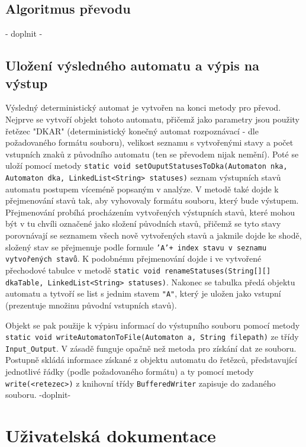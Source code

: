 \documentclass[11pt]{article}
\begin{document}
\subsection{Algoritmus převodu}
- doplnit -

\subsection{Uložení výsledného automatu a výpis na výstup}
Výsledný deterministický automat je vytvořen na konci metody pro převod. Nejprve se vytvoří objekt tohoto automatu, přičemž jako parametry jsou použity řetězec "DKAR" (deterministický konečný automat rozpoznávací - dle požadovaného formátu souboru), velikost seznamu s vytvořenými stavy a počet vstupních znaků z původního automatu (ten se převodem nijak nemění). Poté se uloží pomocí metody \texttt{static void setOuputStatusesToDka(Automaton nka, Automaton dka, LinkedList<String> statuses)} seznam výstupních stavů automatu postupem víceméně popsaným v analýze. V metodě také dojde k přejmenování stavů tak, aby vyhovovaly formátu souboru, který bude výstupem. Přejmenování probíhá procházením vytvořených výstupních stavů, které mohou být v tu chvíli označené jako složení původních stavů, přičemž se tyto stavy porovnávají se seznamem všech nově vytvořených stavů a jakmile dojde ke shodě, složený stav se přejmenuje podle formule \texttt{'A'+ index stavu v seznamu vytvořených stavů}. K podobnému přejmenování dojde i ve vytvořené přechodové tabulce v metodě \texttt{static void renameStatuses(String[][] dkaTable, LinkedList<String> statuses)}. Nakonec se tabulka předá objektu automatu a tytvoří se list s jednim stavem \texttt{"A"}, který je uložen jako vstupní (prezentuje množinu původní vstupních stavů).

Objekt se pak použije k výpisu informací do výstupního souboru pomocí metody \texttt{static void writeAutomatonToFile(Automaton a, String filepath)} ze třídy \texttt{Input\_Output}. V zásadě funguje opačně než metoda pro získání dat ze souboru. Postupně skládá informace získané z objektu automatu do řetězců, představující jednotlivé řádky (podle požadovaného formátu) a ty pomocí metody \texttt{write(<retezec>)} z knihovní třídy \texttt{BufferedWriter} zapisuje do zadaného souboru. 
-doplnit-

\newpage

\section{Uživatelská dokumentace}
\end{document}
